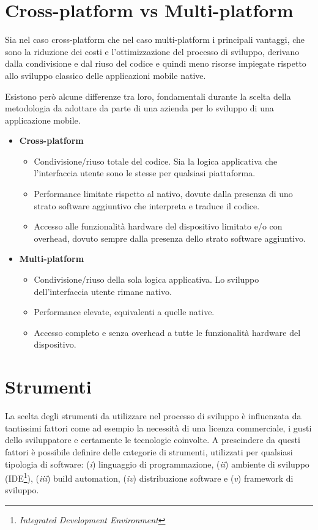 \section{Cross-platform vs Multi-platform}
Sia nel caso cross-platform che nel caso multi-platform i principali vantaggi, che sono la riduzione dei costi e l'ottimizzazione del processo di sviluppo, derivano dalla condivisione e dal riuso del codice e quindi meno risorse impiegate rispetto allo sviluppo classico delle applicazioni mobile native.

Esistono però alcune differenze tra loro, fondamentali durante la scelta della metodologia da adottare da parte di una azienda per lo sviluppo di una applicazione mobile.
\begin{itemize}
    \item \textbf{Cross-platform}
    \begin{itemize}
        \item Condivisione/riuso totale del codice. Sia la logica applicativa che l'interfaccia utente sono le stesse per qualsiasi piattaforma.
        \item Performance limitate rispetto al nativo, dovute dalla presenza di uno strato software aggiuntivo che interpreta e traduce il codice.
        \item Accesso alle funzionalità hardware del dispositivo limitato e/o con overhead, dovuto sempre dalla presenza dello strato software aggiuntivo.
    \end{itemize}
    \item \textbf{Multi-platform}
    \begin{itemize}
        \item Condivisione/riuso della sola logica applicativa. Lo sviluppo dell'interfaccia utente rimane nativo.
        \item Performance elevate, equivalenti a quelle native.
        \item Accesso completo e senza overhead a tutte le funzionalità hardware del dispositivo.
    \end{itemize}
\end{itemize}

\section{Strumenti}
\label{app-multiplatform-tools}
La scelta degli strumenti da utilizzare nel processo di sviluppo è influenzata da tantissimi fattori come ad esempio la necessità di una licenza commerciale, i gusti dello sviluppatore e certamente le tecnologie coinvolte. A prescindere da questi fattori è possibile definire delle categorie di strumenti, utilizzati per qualsiasi tipologia di software: (\textit{i}) linguaggio di programmazione, (\textit{ii}) ambiente di sviluppo (IDE\footnote{\textit{Integrated Development Environment}}), (\textit{iii}) build automation, (\textit{iv}) distribuzione software e (\textit{v}) framework di sviluppo.

